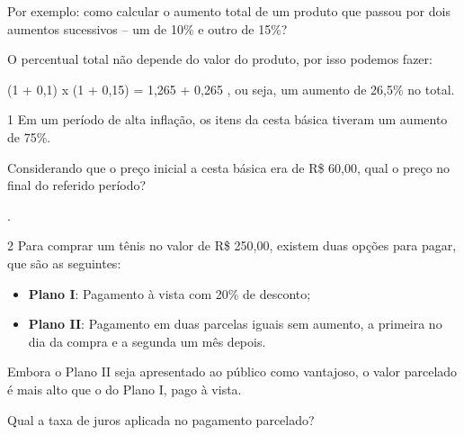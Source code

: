 \begin{escolha}
{{{Por exemplo: como calcular o aumento total de um produto que 
passou por dois aumentos sucessivos -- um de 10\% e outro de 15\%?

O percentual total não depende do valor do produto, por isso podemos
fazer:

(1 + 0,1) x (1 + 0,15) = 1,265  + 0,265 , ou seja, um aumento 
de 26,5\% no total.
}


\num{1} Em um período de alta inflação, os itens da cesta básica tiveram
um aumento de 75\%.

Considerando que o preço inicial a cesta básica era de R\$ 60,00, qual
o preço no final do referido período?

.

\num{2} Para comprar um tênis no valor de R\$ 250,00, existem duas opções
para pagar, que são as seguintes:

\begin{itemize}
  \item \textbf{Plano I}: Pagamento à vista com 20\% de desconto;

  \item \textbf{Plano II}: Pagamento em duas parcelas iguais sem aumento, a primeira no dia da compra e a segunda um mês depois.
\end{itemize}

Embora o Plano II seja apresentado ao público como vantajoso, o valor
parcelado é mais alto que o do Plano I, pago à vista.

Qual a taxa de juros aplicada no pagamento parcelado?


}}
\end{escolha}
